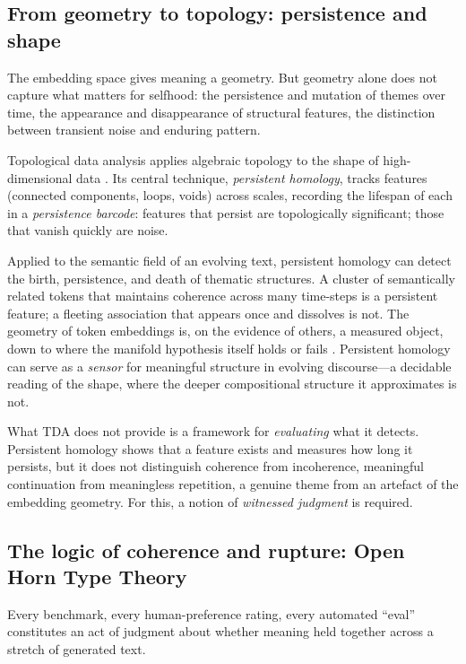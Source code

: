 \subsection{From geometry to topology: persistence and shape}

The embedding space gives meaning a geometry.  But geometry alone does not capture what matters for selfhood: the persistence and mutation of themes over time, the appearance and disappearance of structural features, the distinction between transient noise and enduring pattern.

Topological data analysis applies algebraic topology to the shape of high-dimensional data \cite{carlsson2009topology, edelsbrunner2010}.  Its central technique, \textit{persistent homology}, tracks features (connected components, loops, voids) across scales, recording the lifespan of each in a \textit{persistence barcode}: features that persist are topologically significant; those that vanish quickly are noise.

Applied to the semantic field of an evolving text, persistent homology can detect the birth, persistence, and death of thematic structures.  A cluster of semantically related tokens that maintains coherence across many time-steps is a persistent feature; a fleeting association that appears once and dissolves is not.  The geometry of token embeddings is, on the evidence of others, a measured object, down to where the manifold hypothesis itself holds or fails \cite{robinson2025token}.  Persistent homology can serve as a \textit{sensor} for meaningful structure in evolving discourse---a decidable reading of the shape, where the deeper compositional structure it approximates is not.

What TDA does not provide is a framework for \textit{evaluating} what it detects.  Persistent homology shows that a feature exists and measures how long it persists, but it does not distinguish coherence from incoherence, meaningful continuation from meaningless repetition, a genuine theme from an artefact of the embedding geometry.  For this, a notion of \textit{witnessed judgment} is required.

\subsection{The logic of coherence and rupture: Open Horn Type Theory}

Every benchmark, every human-preference rating, every automated ``eval'' constitutes an act of judgment about whether meaning held together across a stretch of generated text.

